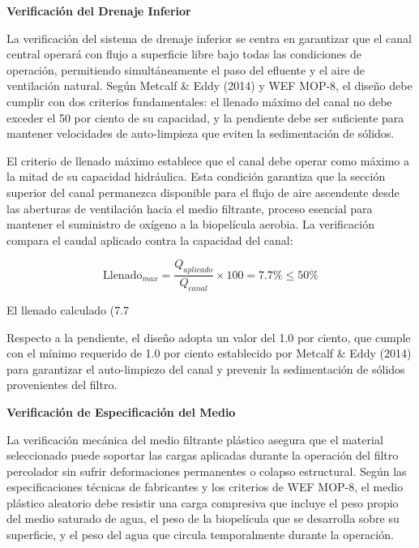 \documentclass[12pt,a4paper]{article}
\begin{document}
\textbf{Verificación del Drenaje Inferior}

La verificación del sistema de drenaje inferior se centra en garantizar que el canal central operará con flujo a superficie libre bajo todas las condiciones de operación, permitiendo simultáneamente el paso del efluente y el aire de ventilación natural. Según Metcalf \& Eddy (2014) y WEF MOP-8, el diseño debe cumplir con dos criterios fundamentales: el llenado máximo del canal no debe exceder el 50 por ciento de su capacidad, y la pendiente debe ser suficiente para mantener velocidades de auto-limpieza que eviten la sedimentación de sólidos.

El criterio de llenado máximo establece que el canal debe operar como máximo a la mitad de su capacidad hidráulica. Esta condición garantiza que la sección superior del canal permanezca disponible para el flujo de aire ascendente desde las aberturas de ventilación hacia el medio filtrante, proceso esencial para mantener el suministro de oxígeno a la biopelícula aerobia. La verificación compara el caudal aplicado contra la capacidad del canal:

\begin{equation}
\text{Llenado}_{max} = \frac{Q_{aplicado}}{Q_{canal}} \times 100 = 7.7 \% \leq 50 \%
\end{equation}

El llenado calculado (7.7%

Respecto a la pendiente, el diseño adopta un valor del 1.0 por ciento, que cumple con el mínimo requerido de 1.0 por ciento establecido por Metcalf \& Eddy (2014) para garantizar el auto-limpiezo del canal y prevenir la sedimentación de sólidos provenientes del filtro.

\textbf{Verificación de Especificación del Medio}

La verificación mecánica del medio filtrante plástico asegura que el material seleccionado puede soportar las cargas aplicadas durante la operación del filtro percolador sin sufrir deformaciones permanentes o colapso estructural. Según las especificaciones técnicas de fabricantes y los criterios de WEF MOP-8, el medio plástico aleatorio debe resistir una carga compresiva que incluye el peso propio del medio saturado de agua, el peso de la biopelícula que se desarrolla sobre su superficie, y el peso del agua que circula temporalmente durante la operación.
\end{document}
